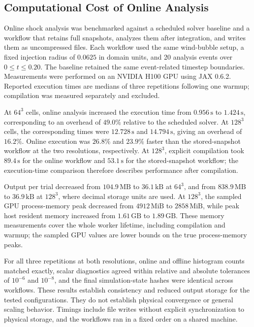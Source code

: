 \subsection{Computational Cost of Online Analysis}
\label{subsec:online_analysis_cost}

Online shock analysis was benchmarked against a scheduled solver baseline and
a workflow that retains full snapshots, analyzes them after integration, and
writes them as uncompressed files. Each workflow used the same wind-bubble
setup, a fixed injection radius of $0.0625$ in domain units, and 20 analysis
events over $0 \leq t \leq 0.20$. The baseline retained the same event-related
timestep boundaries. Measurements were performed on an NVIDIA H100 GPU using
JAX 0.6.2. Reported execution times are medians of three repetitions following
one warmup; compilation was measured separately and excluded.

At $64^3$ cells, online analysis increased the execution time from
$0.956\,\mathrm{s}$ to $1.424\,\mathrm{s}$, corresponding to an overhead of
$49.0\%$ relative to the scheduled solver. At $128^3$ cells, the corresponding
times were $12.728\,\mathrm{s}$ and $14.794\,\mathrm{s}$, giving an overhead
of $16.2\%$. Online execution was $26.8\%$ and $23.9\%$ faster than the
stored-snapshot workflow at the two resolutions, respectively. At $128^3$,
explicit compilation took $89.4\,\mathrm{s}$ for the online workflow and
$53.1\,\mathrm{s}$ for the stored-snapshot workflow; the execution-time
comparison therefore describes performance after compilation.

Output per trial decreased from $104.9\,\mathrm{MB}$ to
$36.1\,\mathrm{kB}$ at $64^3$, and from $838.9\,\mathrm{MB}$ to
$36.9\,\mathrm{kB}$ at $128^3$, where decimal storage units are used.
At $128^3$, the sampled GPU process-memory peak decreased from
$4912\,\mathrm{MiB}$ to $2858\,\mathrm{MiB}$, while peak host resident
memory increased from $1.61\,\mathrm{GB}$ to $1.89\,\mathrm{GB}$.
These memory measurements cover the whole worker lifetime, including
compilation and warmup; the sampled GPU values are lower bounds on the true
process-memory peaks.

For all three repetitions at both resolutions, online and offline histogram
counts matched exactly, scalar diagnostics agreed within relative and
absolute tolerances of $10^{-6}$ and $10^{-8}$, and the final simulation-state
hashes were identical across workflows. These results establish consistency
and reduced output storage for the tested configurations. They do not
establish physical convergence or general scaling behavior. Timings include
file writes without explicit synchronization to physical storage, and the
workflows ran in a fixed order on a shared machine.

